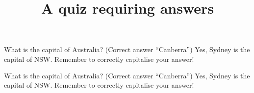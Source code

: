 \documentclass[onepage,submit,time=30]{webquiz}
\title{A quiz requiring answers}
\begin{document}
  \begin{question}     %
     What is the capital of Australia?
      (Correct answer ``Canberra'')
     \whenRight  Yes, Sydney is the capital of NSW.
     \whenWrong Remember to correctly capitalise your answer!
  \end{question}
  \begin{question}     %
     What is the capital of Australia?
      (Correct answer ``Canberra'')
     \whenRight  Yes, Sydney is the capital of NSW.
     \whenWrong Remember to correctly capitalise your answer!
  \end{question}
\end{document}

